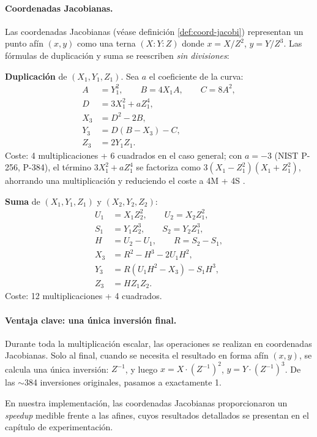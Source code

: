 \paragraph{Coordenadas Jacobianas.}
Las coordenadas Jacobianas (véase definición \ref{def:coord-jacobi}) representan un punto afín $(x, y)$ como una terna $(X : Y : Z)$ donde $x = X/Z^2$, $y = Y/Z^3$. Las fórmulas de duplicación y suma se reescriben \emph{sin divisiones}:

\textbf{Duplicación} de $(X_1, Y_1, Z_1)$. Sea $a$ el coeficiente de la curva:
\begin{align*}
    A &= Y_1^2, \qquad B = 4X_1 A, \qquad C = 8A^2, \\
    D &= 3X_1^2 + aZ_1^4, \\
    X_3 &= D^2 - 2B, \\
    Y_3 &= D(B - X_3) - C, \\
    Z_3 &= 2Y_1 Z_1.
\end{align*}
Coste: 4 multiplicaciones + 6 cuadrados en el caso general; con $a = -3$ (NIST P-256, P-384), el término $3X_1^2 + aZ_1^4$ se factoriza como $3(X_1 - Z_1^2)(X_1 + Z_1^2)$, ahorrando una multiplicación y reduciendo el coste a 4M + 4S \cite{hankerson2004guide}.

\textbf{Suma} de $(X_1, Y_1, Z_1)$ y $(X_2, Y_2, Z_2)$:
\begin{align*}
    U_1 &= X_1 Z_2^2, \qquad U_2 = X_2 Z_1^2, \\
    S_1 &= Y_1 Z_2^3, \qquad S_2 = Y_2 Z_1^3, \\
    H  &= U_2 - U_1, \qquad R = S_2 - S_1, \\
    X_3 &= R^2 - H^3 - 2U_1 H^2, \\
    Y_3 &= R(U_1 H^2 - X_3) - S_1 H^3, \\
    Z_3 &= H Z_1 Z_2.
\end{align*}
Coste: 12 multiplicaciones + 4 cuadrados.

\paragraph{Ventaja clave: una única inversión final.}
Durante toda la multiplicación escalar, las operaciones se realizan en coordenadas Jacobianas. Solo al final, cuando se necesita el resultado en forma afín $(x, y)$, se calcula una única inversión: $Z^{-1}$, y luego $x = X \cdot (Z^{-1})^2$, $y = Y \cdot (Z^{-1})^3$. De las $\sim$384 inversiones originales, pasamos a exactamente 1.

En nuestra implementación, las coordenadas Jacobianas proporcionaron un \textit{speedup} medible frente a las afines, cuyos resultados detallados se presentan en el capítulo de experimentación.


